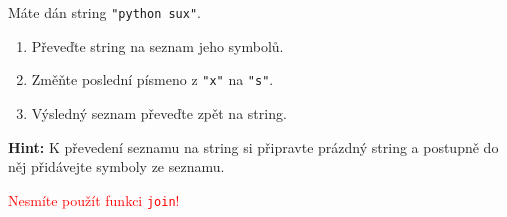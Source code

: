 \question[70]
Máte dán string \texttt{"python sux"}.
\begin{enumerate}[label=(\alph*)]
	\item Převeďte string na seznam jeho symbolů.
	\item Změňte poslední písmeno z \texttt{"x"} na \texttt{"s"}.
	\item Výsledný seznam převeďte zpět na string.
\end{enumerate}
\textbf{Hint:} K převedení seznamu na string si připravte prázdný string a
postupně do něj přidávejte symboly ze seznamu.

\textcolor{red}{Nesmíte použít funkci \texttt{join}!}
